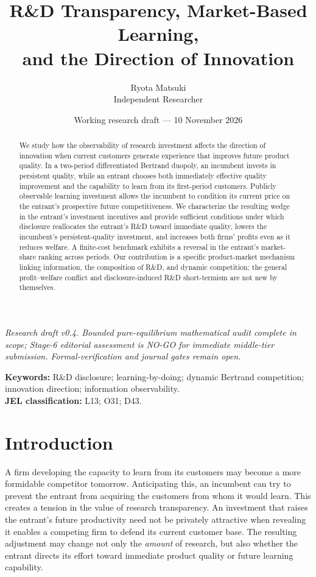 \documentclass[11pt,a4paper]{article}
\title{\bfseries R\&D Transparency, Market-Based Learning,\\ and the Direction of Innovation}
\author{Ryota Matsuki\\\small Independent Researcher}
\date{\small Working research draft --- 10 November 2026}
\numberwithin{equation}{section}
\theoremstyle{remark}
\begin{document}
\maketitle
\begin{center}
\footnotesize\emph{Research draft v0.4. Bounded pure-equilibrium mathematical audit complete in scope; Stage-6 editorial assessment is NO-GO for immediate middle-tier submission. Formal-verification and journal gates remain open.}
\end{center}
\vspace{-1em}
\begin{abstract}
We study how the observability of research investment affects the direction of innovation when current customers generate experience that improves future product quality. In a two-period differentiated Bertrand duopoly, an incumbent invests in persistent quality, while an entrant chooses both immediately effective quality improvement and the capability to learn from its first-period customers. Publicly observable learning investment allows the incumbent to condition its current price on the entrant's prospective future competitiveness. We characterize the resulting wedge in the entrant's investment incentives and provide sufficient conditions under which disclosure reallocates the entrant's R\&D toward immediate quality, lowers the incumbent's persistent-quality investment, and increases both firms' profits even as it reduces welfare. A finite-cost benchmark exhibits a reversal in the entrant's market-share ranking across periods. Our contribution is a specific product-market mechanism linking information, the composition of R\&D, and dynamic competition; the general profit--welfare conflict and disclosure-induced R\&D short-termism are not new by themselves.
\end{abstract}
\noindent\textbf{Keywords:} R\&D disclosure; learning-by-doing; dynamic Bertrand competition; innovation direction; information observability.\\
\noindent\textbf{JEL classification:} L13; O31; D43.
\vspace{0.6em}

\section{Introduction}\label{sec:intro}

A firm developing the capacity to learn from its customers may become a more formidable competitor tomorrow. Anticipating this, an incumbent can try to prevent the entrant from acquiring the customers from whom it would learn. This creates a tension in the value of research transparency. An investment that raises the entrant's future productivity need not be privately attractive when revealing it enables a competing firm to defend its current customer base. The resulting adjustment may change not only the \emph{amount} of research, but also whether the entrant directs its effort toward immediate product quality or future learning capability.
\end{document}
